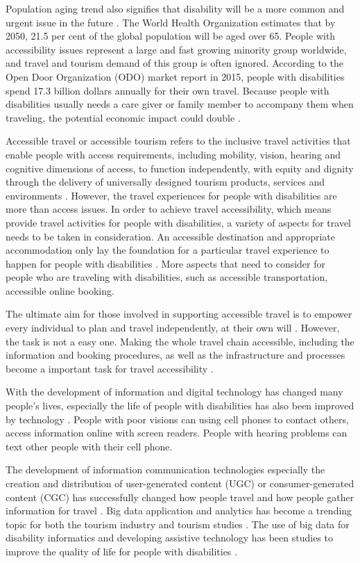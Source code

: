 Population aging trend also signifies that disability will be a more common
and urgent issue in the future \cite{Grue}. The World Health Organization estimates that
by 2050, 21.5 per cent of the global population will be aged over 65. People with
accessibility issues represent a large and fast growing minority group
worldwide, and travel and tourism demand of this group is often ignored. According to the
Open Door Organization (ODO) market report in 2015, people with disabilities spend 17.3
billion dollars annually for their own travel. Because people with disabilities usually
needs a care giver or family member to accompany them when traveling, the potential
economic impact could double \cite{ODO}. 


Accessible travel or accessible tourism refers to the inclusive travel activities that
enable people with access requirements, including mobility, vision, hearing and cognitive
dimensions of access, to function independently, with equity and dignity through the
delivery of universally designed tourism products, services and environments \cite{Ama}.
However, the travel experiences for people with disabilities are more than access
issues. In order to achieve travel accessibility, which means provide travel activities
for people with disabilities, a variety of aspects for travel needs to be taken in
consideration. An accessible destination and appropriate accommodation only lay the foundation for a particular travel experience to happen for people with disabilities \cite{ODO}. More aspects that need to
consider for people who are traveling with disabilities, such as accessible
transportation, accessible online booking\cite{Ama}.

The ultimate aim for those involved in supporting accessible travel is to empower every
individual to plan and travel independently, at their own will \cite{zhang2016}. However,
the task is not a easy one. Making the whole travel chain accessible, including the
information and booking procedures, as well as the infrastructure and processes become a
important task for travel accessibility \cite{Ama}. 

With the development of information and digital technology has changed many people's
lives, especially the life of people with disabilities has also been improved by
technology \cite{GJT14}. People with poor visions can using cell phones to contact
others, access information online with screen readers. People with hearing problems can
text other people with their cell phone. 

The development of information communication technologies especially the creation
and distribution of user-generated content (UGC) or consumer-generated content (CGC) has
successfully changed how people travel and how people gather information for travel
\cite{chung2009}. Big data application and analytics has become a trending topic for both
the tourism industry and tourism studies \cite{chung2009}. The use of big data for
disability informatics and developing assistive technology has been studies to improve
the quality of life for people with disabilities \cite{Grue}. 

